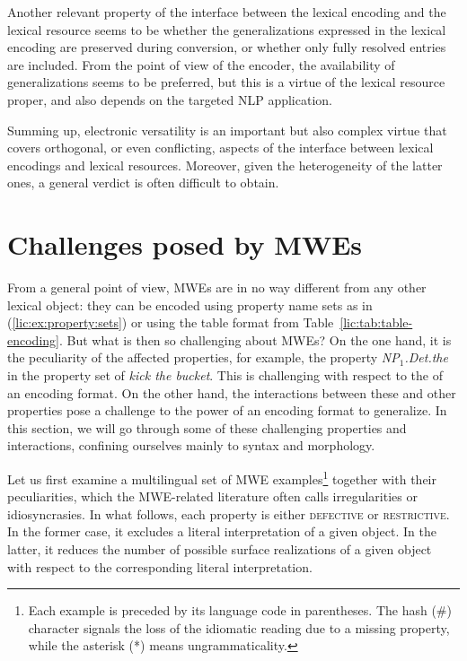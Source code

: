 \documentclass[output=paper]{langsci/langscibook}
\begin{document}
Another relevant property of the interface between the lexical encoding and the lexical resource seems to be whether the generalizations expressed in the lexical encoding are preserved during conversion, or whether only fully resolved entries are included. From the point of view of the encoder, the availability of generalizations seems to be preferred, but this is a virtue of the lexical resource proper, and also depends on the targeted NLP application.

Summing up, electronic versatility is an important but also complex virtue that covers orthogonal, or even conflicting, aspects of the interface between lexical encodings and lexical resources. Moreover, given the heterogeneity of the latter ones, a general verdict is often difficult to obtain.    


%

\section{Challenges posed by MWEs}
\label{lic:sec:challenges}

From a general point of view, MWEs are in no way different from any other lexical object: they can be encoded using property name sets as in (\ref{lic:ex:property:sets}) or using the table format from Table~\ref{lic:tab:table-encoding}. But what is then so challenging about MWEs? On the one hand, it is the peculiarity of the affected properties, for example, the property \textit{NP$_1$.Det.the} in the property set of \textit{kick the bucket}. This is challenging with respect to the  of an encoding format. On the other hand, the interactions between these and other properties pose a challenge to the power of an encoding format to generalize. In this section, we will go through some of these challenging properties and interactions,  confining ourselves mainly to syntax and morphology.

Let us first examine a multilingual set of MWE examples\footnote{Each example is preceded by its language code in parentheses. The hash (\#) character signals the loss of the idiomatic reading due to a missing property, while the asterisk (*) means ungrammaticality.} together with their peculiarities, which the MWE-related literature often calls irregularities or idiosyncrasies. In what follows, each property is either \textsc{defective} or \textsc{restrictive}. In the former case, it excludes a literal interpretation of a given object. In the latter, it reduces the number of possible surface realizations of a given object with respect to the corresponding literal interpretation. 
\end{document}
